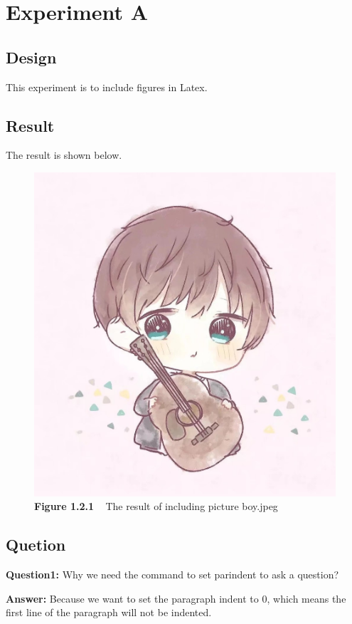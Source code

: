 \section{Experiment A}

\subsection{Design}
This experiment is to include figures in Latex.

\subsection{Result}
The result is shown below.

\begin{figure}[H]
    \centering
    \includegraphics[width=12cm]{figures/boy.jpeg}
    \caption*{\textbf{Figure 1.2.1} ~ The result of including picture boy.jpeg}
\end{figure}

\subsection{Quetion}

\setlength{\parindent}{0em}

\textbf{Question1:} Why we need the command to set parindent to ask a question?

\textbf{Answer:} Because we want to set the paragraph indent to 0, which means the first line of the paragraph will not be indented.

\setlength{\parindent}{1.5em}
